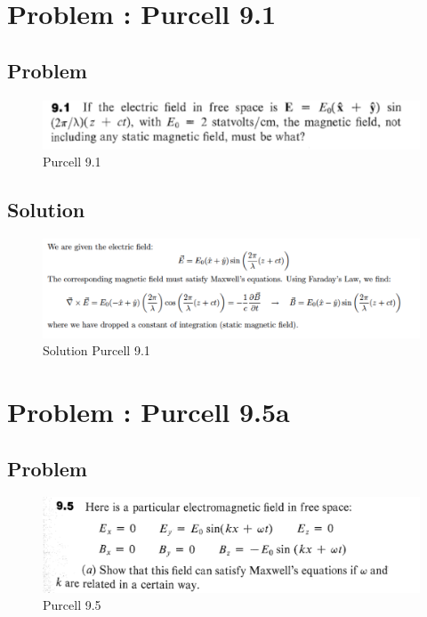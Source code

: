 \documentclass[solutions]{esg8022pset}
\begin{document}
\section{Problem \thesection: Purcell 9.1}
\subsection{Problem}

\begin{figure}[H]
    \centering
    \includegraphics[width = 15cm]{pu901}
    \caption{Purcell 9.1}
  \end{figure}
  
\subsection{Solution}
  \begin{figure}[H]
    \centering
    \includegraphics[width = 15cm]{solpu901}
    \caption{Solution Purcell 9.1}
  \end{figure}
\section{Problem \thesection: Purcell 9.5a}
\subsection{Problem}
 \begin{figure}[H]
    \centering
    \includegraphics[width = 15cm]{pu905}
    \caption{Purcell 9.5}
  \end{figure}
\end{document}
